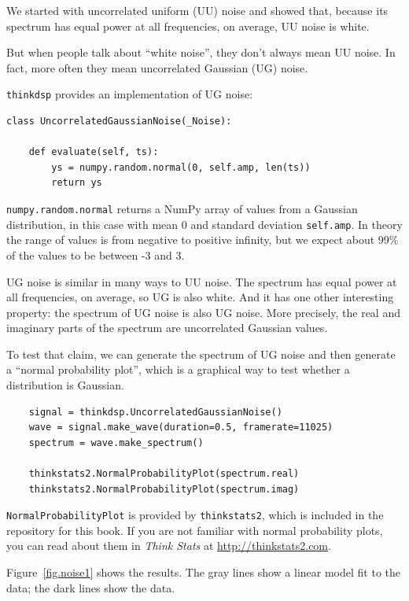 \documentclass[12pt]{book}
\begin{document}
We started with uncorrelated uniform (UU) noise and showed that,
because its spectrum has equal power at all frequencies, on
average, UU noise is white.

But when people talk about ``white noise'', they don't always
mean UU noise.  In fact, more often they mean uncorrelated
Gaussian (UG) noise.

{\tt thinkdsp} provides an implementation of UG noise:

\begin{verbatim}
class UncorrelatedGaussianNoise(_Noise):

    def evaluate(self, ts):
        ys = numpy.random.normal(0, self.amp, len(ts))
        return ys
\end{verbatim}

{\tt numpy.random.normal} returns a NumPy array of values from a
Gaussian distribution, in this case with mean 0 and standard deviation
{\tt self.amp}.  In theory the range of values is from negative to
positive infinity, but we expect about 99\% of the values to be
between -3 and 3.

UG noise is similar in many ways to UU noise.  The spectrum has
equal power at all frequencies, on average, so UG is also white.
And it has one other interesting property: the spectrum of UG
noise is also UG noise.  More precisely, the real and imaginary
parts of the spectrum are uncorrelated Gaussian values.

To test that claim, we can generate the spectrum of UG noise and
then generate a ``normal probability plot'', which is a graphical
way to test whether a distribution is Gaussian.

\begin{verbatim}
    signal = thinkdsp.UncorrelatedGaussianNoise()
    wave = signal.make_wave(duration=0.5, framerate=11025)
    spectrum = wave.make_spectrum()

    thinkstats2.NormalProbabilityPlot(spectrum.real)
    thinkstats2.NormalProbabilityPlot(spectrum.imag)
\end{verbatim}

{\tt NormalProbabilityPlot} is provided by {\tt thinkstats2}, which is
included in the repository for this book.  If you are not familiar
with normal probability plots, you can read about them in
{\it Think Stats} at \url{http://thinkstats2.com}.

Figure~\ref{fig.noise1} shows the results.  The gray lines
show a linear model fit to the data; the dark lines show the
data.
\end{document}
